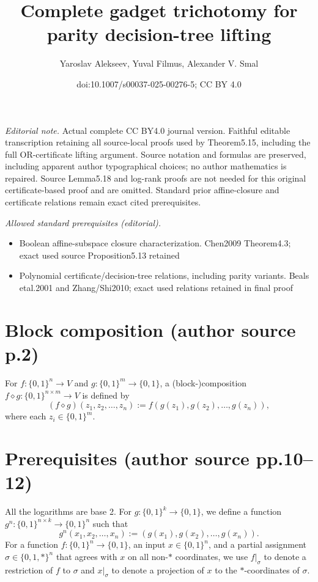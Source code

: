 \documentclass[10pt,a4paper]{article}
\title{Complete gadget trichotomy for parity decision-tree lifting}
\author{Yaroslav Alekseev, Yuval Filmus, Alexander V. Smal}
\date{doi:10.1007/s00037-025-00276-5; CC BY 4.0}
\newcommand{\bits}{\{0,1\}}
\newcommand{\comp}{\diamond}
\begin{document}
\maketitle
\noindent\textit{Editorial note.} Actual complete CC BY4.0 journal version. Faithful editable transcription retaining all source-local proofs used by Theorem5.15, including the full OR-certificate lifting argument. Source notation and formulas are preserved, including apparent author typographical choices; no author mathematics is repaired. Source Lemma5.18 and log-rank proofs are not needed for this original certificate-based proof and are omitted. Standard prior affine-closure and certificate relations remain exact cited prerequisites.\par\medskip
\noindent\textit{Allowed standard prerequisites (editorial).}\begin{itemize}
\item Boolean affine-subspace closure characterization. Chen2009 Theorem4.3; exact used source Proposition5.13 retained
\item Polynomial certificate/decision-tree relations, including parity variants. Beals etal.2001 and Zhang/Shi2010; exact used relations retained in final proof
\end{itemize}\medskip
\section*{Block composition (author source p.2)}
For $f:\bits^n\to V$ and $g:\bits^m\to\bits$, a (block-)composition $f\comp g:\bits^{n\times m}\to V$ is defined by
\[(f\comp g)(z_1,z_2,\ldots,z_n):=f(g(z_1),g(z_2),\ldots,g(z_n)),\]
where each $z_i\in\bits^m$.
\section*{Prerequisites (author source pp.10--12)}
All the logarithms are base 2. For $g:\bits^k\to\bits$, we define a function $g^n:\bits^{n\times k}\to\bits^n$ such that
\[g^n(x_1,x_2,\ldots,x_n):=(g(x_1),g(x_2),\ldots,g(x_n)).\]
For a function $f:\bits^n\to\bits$, an input $x\in\bits^n$, and a partial assignment $\sigma\in\{0,1,*\}^n$ that agrees with $x$ on all non-$*$ coordinates, we use $f|_\sigma$ to denote a restriction of $f$ to $\sigma$ and $x|_\sigma$ to denote a projection of $x$ to the $*$-coordinates of $\sigma$.
\end{document}
